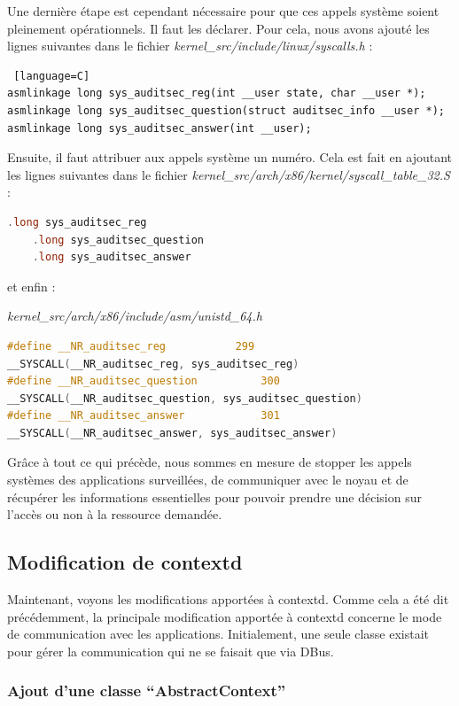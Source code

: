 \documentclass[pdftex,a4paper,titlepage,11pt]{article}
\begin{document}
Une dernière étape est cependant nécessaire pour que ces appels système soient pleinement opérationnels. Il faut les déclarer. Pour cela, nous avons ajouté les lignes suivantes dans le fichier \textit{{kernel\_src}/include/linux/syscalls.h} :

\begin{lstlisting} [language=C]
asmlinkage long sys_auditsec_reg(int __user state, char __user *);
asmlinkage long sys_auditsec_question(struct auditsec_info __user *);
asmlinkage long sys_auditsec_answer(int __user);
\end{lstlisting}

Ensuite, il faut attribuer aux appels système un numéro. Cela est fait en ajoutant les lignes suivantes dans le fichier \textit{{kernel\_src}/arch/x86/kernel/syscall\_table\_32.S} : %

\begin{lstlisting}[language=C]
	.long sys_auditsec_reg
	.long sys_auditsec_question
	.long sys_auditsec_answer
\end{lstlisting}

et enfin :

\textit{{kernel\_src}/arch/x86/include/asm/unistd\_64.h}
\begin{lstlisting}[language=C]
#define __NR_auditsec_reg			299
__SYSCALL(__NR_auditsec_reg, sys_auditsec_reg)
#define __NR_auditsec_question			300
__SYSCALL(__NR_auditsec_question, sys_auditsec_question)
#define __NR_auditsec_answer			301
__SYSCALL(__NR_auditsec_answer, sys_auditsec_answer)
\end{lstlisting}

Grâce à tout ce qui précède, nous sommes en mesure de stopper les appels systèmes des applications surveillées, de communiquer avec le noyau et de récupérer les informations essentielles pour pouvoir prendre une décision sur l'accès ou non à la ressource demandée.

\subsection{Modification de contextd}

Maintenant, voyons les modifications apportées à contextd. Comme cela a été dit précédemment, la principale modification apportée à contextd concerne le mode de communication avec les applications. Initialement, une seule classe existait pour gérer la communication qui ne se faisait que via DBus.

\subsubsection{Ajout d'une classe ``AbstractContext''}
\end{document}
